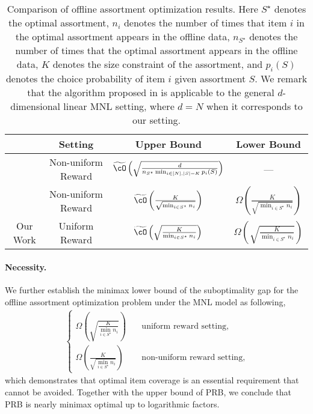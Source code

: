 \documentclass[10pt, letterpaper]{article}
\begin{document}
\begin{table}
    \centering
    \begin{tabular}{|c|c|c|c|}
        \hline
         & Setting & Upper Bound & Lower Bound \\
        \hline
        \cite{dong2023pasta} & Non-uniform Reward & $\widetilde{\cO}\left(\sqrt{\frac{d}{n_{S^\star} \min_{i\in [N],\lvert S \rvert = K} p_i(S)}}\right)$ & --- \\
        \hline
         \cellcolor{blue!15}
 & \cellcolor{blue!15} Non-uniform Reward &  \cellcolor{blue!15} $\widetilde{\cO}\left(\frac{K}{\sqrt{\min_{i \in S^\star} n_i}}\right)$ & \cellcolor{blue!15} $\Omega\left(\frac{K}{\sqrt{\min_{i \in S^\star} n_i}}\right)$ \\
        \cline{2-4}
         \multirow{-2}{*}{\cellcolor{blue!15}Our Work} & \cellcolor{blue!15} Uniform Reward & \cellcolor{blue!15} $\widetilde{\cO}\left(\sqrt{\frac{K}{\min_{i\in S^\star} n_i}}\right)$  & \cellcolor{blue!15} $\Omega\left(\sqrt{\frac{K}{\min_{i\in S^\star} n_i}}\right)$ \\
        \hline
    \end{tabular}
    \caption{Comparison of offline assortment optimization results. 
    Here $S^{\star}$ denotes the optimal assortment, $n_i$ denotes the number of times that item $i$ in the optimal assortment appears in the offline data, $n_{S^{\star}}$ denotes the number of times that the optimal assortment appears in the offline data, $K$ denotes the size constraint of the assortment, and $p_i(S)$ denotes the choice probability of item $i$ given assortment $S$.
    We remark that the algorithm proposed in \citet{dong2023pasta} is applicable to the general $d$-dimensional linear MNL setting, where $d = N$ when it corresponds to our setting.}
    \label{tab:comparison}
\end{table}

\paragraph{Necessity.} We further establish the minimax lower bound of the suboptimality gap for the offline assortment optimization problem under the MNL model as following,
\begin{align*}
\begin{cases}
    \Omega\left(\sqrt{\frac{K}{\min_{i\in S^\star} n_i}}\right) & \quad \text{uniform reward setting}, \\
    \Omega\left(\frac{K}{\sqrt{\min_{i \in S^\star} n_i}}\right) & \quad \text{non-uniform reward setting},
\end{cases}
\end{align*}
which demonstrates that optimal item coverage is an essential requirement that cannot be avoided. 
Together with the upper bound of PRB, we conclude that PRB is nearly minimax optimal up to logarithmic factors. 
\end{document}
